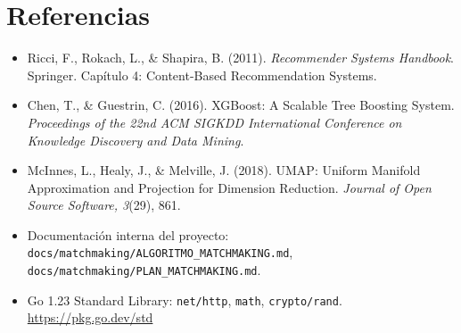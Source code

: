 \documentclass[11pt,a4paper]{article}
\begin{document}
\section{Referencias}
\begin{itemize}
    \item Ricci, F., Rokach, L., \& Shapira, B. (2011). \textit{Recommender Systems Handbook}. Springer. Capítulo 4: Content-Based Recommendation Systems.
    \item Chen, T., \& Guestrin, C. (2016). XGBoost: A Scalable Tree Boosting System. \textit{Proceedings of the 22nd ACM SIGKDD International Conference on Knowledge Discovery and Data Mining}.
    \item McInnes, L., Healy, J., \& Melville, J. (2018). UMAP: Uniform Manifold Approximation and Projection for Dimension Reduction. \textit{Journal of Open Source Software, 3}(29), 861.
    \item Documentación interna del proyecto: \texttt{docs/matchmaking/ALGORITMO\_MATCHMAKING.md}, \texttt{docs/matchmaking/PLAN\_MATCHMAKING.md}.
    \item Go 1.23 Standard Library: \texttt{net/http}, \texttt{math}, \texttt{crypto/rand}. \url{https://pkg.go.dev/std}
\end{itemize}
\end{document}
